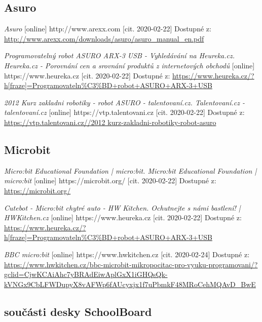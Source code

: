 \documentclass{template/socthesis}
\begin{document}
\begin{thebibliography}{1}
	\subsection*{Asuro}
	\label{Asuro}
	\textit{Asuro} [online] http://www.arexx.com [cit. 2020-02-22] Dostupné z:
	\url{ http://www.arexx.com/downloads/asuro/asuro_manual_en.pdf}
	
	\textit{Programovatelný robot ASURO ARX-3 USB - Vyhledávání na Heureka.cz. Heureka.cz - Porovnání cen a srovnání produktů z internetových obchodů } [online] https://www.heureka.cz [cit. 2020-02-22] Dostupné z:
	\url{https://www.heureka.cz/?h[fraze]=Programovateln%C3%BD+robot+ASURO+ARX-3+USB}
		
	\textit{2012 Kurz zakladni robotiky - robot ASURO - talentovaní.cz. Talentovaní.cz - talentovaní.cz} [online] https://vtp.talentovani.cz [cit. 2020-02-22] Dostupné z:
	\url{https://vtp.talentovani.cz//2012 kurz-zakladni-robotiky-robot-asuro}
		
	\subsection*{Microbit}
	\label{Microbit}
	\textit{Micro:bit Educational Foundation | micro:bit. Micro:bit Educational Foundation | micro:bit} [online] https://microbit.org/ [cit. 2020-02-22] Dostupné z:
	\url{https://microbit.org/}
		
	\textit{Cutebot - Micro:bit chytré auto - HW Kitchen. Ochutnejte s námi bastlení! | HWKitchen.cz} [online] https://www.heureka.cz [cit. 2020-02-22] Dostupné z:
	\url{https://www.heureka.cz/?h[fraze]=Programovateln%C3%BD+robot+ASURO+ARX-3+USB}
	
	\textit{BBC micro:bit} [online] https://www.hwkitchen.cz [cit. 2020-02-24] Dostupné z:
	\url{https://www.hwkitchen.cz/bbc-microbit-mikropocitac-pro-vyuku-programovani/?gclid=CjwKCAiAhc7yBRAdEiwAplGxX1iGHQsQk-kVNGx9CbLFWDupyX8vAFWp6fAUcyxjx1f7uPbmkF48MRoCehMQAvD_BwE}
			
			
			\subsection*{součásti desky SchoolBoard}
			

\end{thebibliography}
\end{document}
